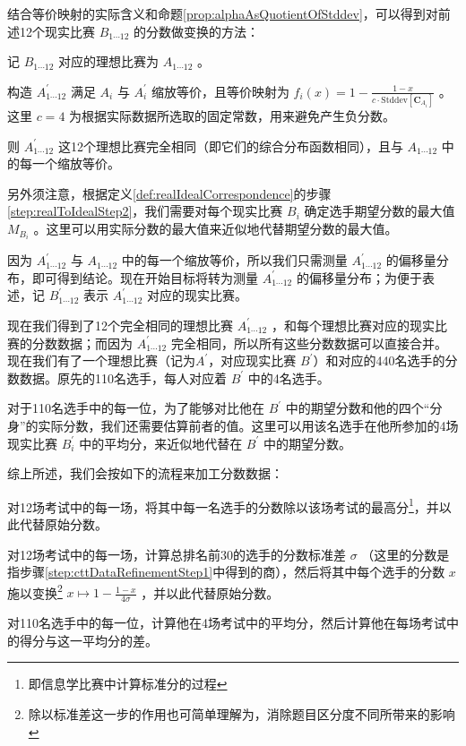         结合等价映射的实际含义和命题\ref{prop:alphaAsQuotientOfStddev}，可以得到对前述12个现实比赛 $B_{1\cdots 12}$ 的分数做变换的方法：
        \begin{asparaenum}[\bfseries{步骤} 1.]
            \item 记 $B_{1\cdots 12}$ 对应的理想比赛为 $A_{1\cdots 12}$ 。
            \item 构造 $A^{\prime}_{1\cdots 12}$ 满足 $A_i$ 与 $A^{\prime}_i$ 缩放等价，且等价映射为 $f_i(x)=1-\frac{1-x}{c\cdot\mathrm{Stddev}\left[\bm{C}_{A_i}\right]}$ 。这里 $c=4$ 为根据实际数据所选取的固定常数，用来避免产生负分数。
            \item 则 $A^{\prime}_{1\cdots 12}$ 这12个理想比赛完全相同（即它们的综合分布函数相同），且与 $A_{1\cdots 12}$ 中的每一个缩放等价。
        \end{asparaenum}

        \vspace{1.5ex}

        另外须注意，根据定义\ref{def:realIdealCorrespondence}的步骤\ref{step:realToIdealStep2}，我们需要对每个现实比赛 $B_i$ 确定选手期望分数的最大值 $M_{B_i}$ 。这里可以用实际分数的最大值来近似地代替期望分数的最大值。
        
        因为 $A^{\prime}_{1\cdots 12}$ 与 $A_{1\cdots 12}$ 中的每一个缩放等价，所以我们只需测量 $A^{\prime}_{1\cdots 12}$ 的偏移量分布，即可得到结论。现在开始目标将转为测量 $A^{\prime}_{1\cdots 12}$ 的偏移量分布；为便于表述，记 $B^{\prime}_{1\cdots 12}$ 表示 $A^{\prime}_{1\cdots 12}$ 对应的现实比赛。

        现在我们得到了12个完全相同的理想比赛 $A^{\prime}_{1\cdots 12}$ ，和每个理想比赛对应的现实比赛的分数数据；而因为 $A^{\prime}_{1\cdots 12}$ 完全相同，所以所有这些分数数据可以直接合并。现在我们有了一个理想比赛（记为$A^{\prime}$，对应现实比赛 $B^{\prime}$）和对应的440名选手的分数数据。原先的110名选手，每人对应着 $B^{\prime}$ 中的4名选手。

        对于110名选手中的每一位，为了能够对比他在 $B^{\prime}$ 中的期望分数和他的四个“分身”的实际分数，我们还需要估算前者的值。这里可以用该名选手在他所参加的4场现实比赛 $B^{\prime}_i$ 中的平均分，来近似地代替在 $B^{\prime}$ 中的期望分数。

        \vspace{1.5ex}

        综上所述，我们会按如下的流程来加工分数数据：
        \begin{asparaenum}[\bfseries{步骤} 1.]
            \item \label{step:cttDataRefinementStep1} 对12场考试中的每一场，将其中每一名选手的分数除以该场考试的最高分\footnote{即信息学比赛中计算标准分的过程}，并以此代替原始分数。
            \item 对12场考试中的每一场，计算总排名前30的选手的分数标准差 $\sigma$ （这里的分数是指步骤\ref{step:cttDataRefinementStep1}中得到的商），然后将其中每个选手的分数 $x$ 施以变换\footnote{除以标准差这一步的作用也可简单理解为，消除题目区分度不同所带来的影响} $x\mapsto 1-\frac{1-x}{4\sigma}$ ，并以此代替原始分数。
            \item 对110名选手中的每一位，计算他在4场考试中的平均分，然后计算他在每场考试中的得分与这一平均分的差。
        \end{asparaenum}

